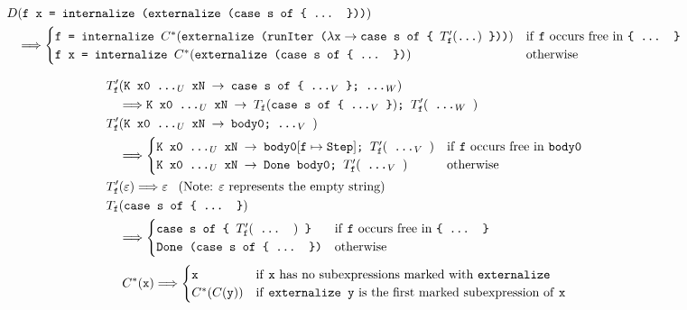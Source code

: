 \documentclass[sigplan,anonymous,review]{acmart}
\newcommand{\expr}[1]{(#1)} %
\newcommand{\rarr}{\rightarrow}
\newcommand{\rewrites}{\Longrightarrow}
\newcommand{\tdots}{\ttt{...}}
\newcommand{\exprdots}{\expr{\tdots}}
\newcommand{\ttt}{\texttt}
\begin{document}
\begin{align*}
  D&\expr{\ttt{f x = internalize (externalize (case s of \{ ... \}))}}\\
      &\rewrites \begin{cases}
        \ttt{f = internalize $C^{*}\expr{\ttt{externalize (runIter ($\lambda \ttt{x} \rarr \ttt{case s of \{ $T'_{\ttt{f}}\exprdots$}$ \}))}}$} & \text{if \ttt{f} occurs free in \ttt{\{ ... \}}}\\
        \ttt{f x = internalize $C^{*}\expr{\ttt{externalize (case s of \{ ... \})}}$} & \text{otherwise}
      \end{cases}
\end{align*}

\begin{align*}
  T'_{\ttt{f}}&\expr{\ttt{K x0 ...$_U$ xN $\rarr$ case s of \{ ...$_V$ \}; ...$_W$}}\\
    &\rewrites
        \ttt{K x0 ...$_U$ xN $\rarr$ $T_{\ttt{f}}\expr{\ttt{case s of \{ ...$_V$ \}}}$; $T'_{\ttt{f}}\expr{\ttt{ ...$_W$ }}$}\\
  T'_{\ttt{f}}&\expr{\ttt{K x0 ...$_U$ xN $\rarr$ body0; ...$_V$ }}\\
    &\rewrites
      \begin{cases}
        \ttt{K x0 ...$_U$ xN $\rarr$ body0}[\ttt{f} \mapsto \ttt{Step}]\ttt{; }T'_{\ttt{f}}\expr{\ttt{ ...$_V$ }} & \text{if \ttt{f} occurs free in \ttt{body0}}\\
        \ttt{K x0 ...$_U$ xN $\rarr$ Done body0; $T'_{\ttt{f}}\expr{\ttt{ ...$_V$ }}$} & \text{otherwise}
      \end{cases}\\
  T'_{\ttt{f}}&\expr{\varepsilon} \rewrites \varepsilon\;\;\; \text{(Note: $\varepsilon$ represents the empty string)}\\
  T_{\ttt{f}}&\expr{\ttt{case s of \{ ... \}}}\\
    &\rewrites
      \begin{cases}
        \ttt{case s of \{ $T'_{\ttt{f}}\expr{\ttt{ ... }}$ \}} & \text{if \ttt{f} occurs free in \ttt{\{ ... \}}}\\
        \ttt{Done (case s of \{ ... \})} & \text{otherwise}
      \end{cases}
\end{align*}
\begin{align*}
  &C^{*}\expr{\ttt{x}} \rewrites
    \begin{cases}
      \ttt{x} & \text{if \ttt{x} has no subexpressions marked with \ttt{externalize}}\\
      C^{*}\expr{C\expr{\ttt{y}}} & \text{if \ttt{externalize y} is the first marked subexpression of \ttt{x}}\\
    \end{cases}\\
\end{align*}
\end{document}
